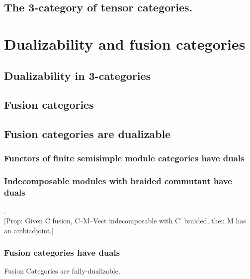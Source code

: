 \documentclass{amsart}
\begin{document}
\subsection{The 3-category of tensor categories.}

\section{Dualizability and fusion categories}

\subsection{Dualizability in 3-categories}

\subsection{Fusion categories}

\subsection{Fusion categories are dualizable}

\subsubsection{Functors of finite semisimple module categories have duals}

\subsubsection{Indecomposable modules with braided commutant have duals} .\\

	[Prop: Given C fusion, C--M--Vect indecomposable with C' braided, then M has an ambiadjoint.]

\subsubsection{Fusion categories have duals}

\begin{theorem}
	Fusion Categories are fully-dualizable. 
\end{theorem}
	
\end{document}
